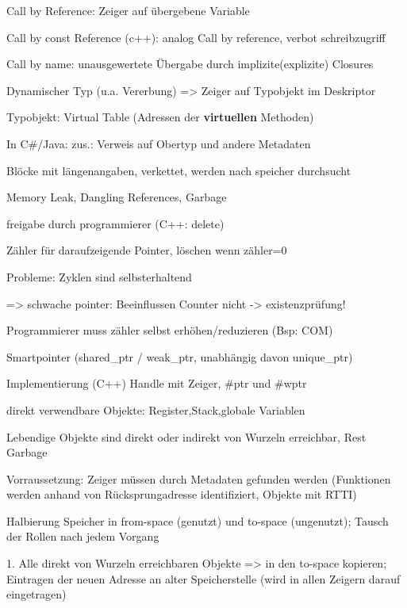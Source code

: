 Call by Reference: Zeiger auf übergebene Variable

Call by const Reference (c++): analog Call by reference, verbot schreibzugriff

Call by name: unausgewertete Übergabe durch implizite(explizite) Closures






Dynamischer Typ (u.a. Vererbung) => Zeiger auf Typobjekt im Deskriptor

Typobjekt: Virtual Table (Adressen der \textbf{virtuellen} Methoden)

In C\#/Java: zus.: Verweis auf Obertyp und andere Metadaten


Blöcke mit längenangaben, verkettet, werden nach speicher durchsucht

 Memory Leak, Dangling References, Garbage

freigabe durch programmierer (C++: delete)

Zähler für daraufzeigende Pointer, löschen wenn zähler=0

Probleme: Zyklen sind selbsterhaltend 

=> schwache pointer: Beeinflussen Counter nicht -> existenzprüfung!

 Programmierer muss zähler selbst erhöhen/reduzieren (Bsp: COM)

 Smartpointer (shared\_ptr / weak\_ptr, unabhängig davon unique\_ptr)

Implementierung (C++) Handle mit Zeiger, \#ptr und \#wptr

 direkt verwendbare Objekte: Register,Stack,globale Variablen

Lebendige Objekte sind direkt oder indirekt von Wurzeln erreichbar, Rest Garbage

Vorraussetzung: Zeiger müssen durch Metadaten gefunden werden (Funktionen werden anhand von Rücksprungadresse identifiziert, Objekte mit RTTI)

Halbierung Speicher in from-space (genutzt) und to-space (ungenutzt);
Tausch der Rollen nach jedem Vorgang

1. Alle direkt von Wurzeln erreichbaren Objekte => in den to-space kopieren; Eintragen der neuen Adresse an alter Speicherstelle (wird in allen Zeigern darauf eingetragen)


